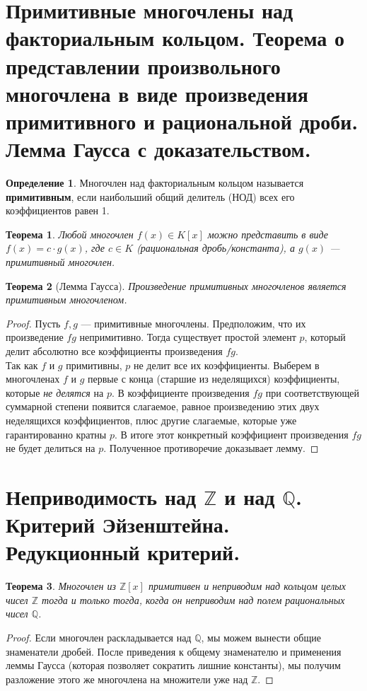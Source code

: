 \documentclass[12pt, a4paper]{article}
\theoremstyle{definition}
\newtheorem{definition}{Определение}[section]
\theoremstyle{plain}
\newtheorem{theorem}{Теорема}[section]
\begin{document}
	\newpage
	\section{Примитивные многочлены над факториальным кольцом. Теорема о представлении произвольного многочлена в виде произведения примитивного и рациональной дроби. Лемма Гаусса с доказательством.}
	
	\begin{definition}
		Многочлен над факториальным кольцом называется \textbf{примитивным}, если наибольший общий делитель (НОД) всех его коэффициентов равен 1.
	\end{definition}
	
	\begin{theorem}
		Любой многочлен $f(x) \in K[x]$ можно представить в виде $f(x) = c \cdot g(x)$, где $c \in K$ (рациональная дробь/константа), а $g(x)$ — примитивный многочлен.
	\end{theorem}
	
	\begin{theorem}[Лемма Гаусса]
		Произведение примитивных многочленов является примитивным многочленом.
	\end{theorem}
	\begin{proof}
		Пусть $f, g$ — примитивные многочлены. Предположим, что их произведение $fg$ непримитивно. Тогда существует простой элемент $p$, который делит абсолютно все коэффициенты произведения $fg$. \\
		Так как $f$ и $g$ примитивны, $p$ не делит все их коэффициенты. Выберем в многочленах $f$ и $g$ первые с конца (старшие из неделящихся) коэффициенты, которые \textit{не делятся} на $p$. В коэффициенте произведения $fg$ при соответствующей суммарной степени появится слагаемое, равное произведению этих двух неделящихся коэффициентов, плюс другие слагаемые, которые уже гарантированно кратны $p$. В итоге этот конкретный коэффициент произведения $fg$ не будет делиться на $p$. Полученное противоречие доказывает лемму.
	\end{proof}
	
	\newpage
	\section{Неприводимость над $\mathbb{Z}$ и над $\mathbb{Q}$. Критерий Эйзенштейна. Редукционный критерий.}
	
	\begin{theorem}
		Многочлен из $\mathbb{Z}[x]$ примитивен и неприводим над кольцом целых чисел $\mathbb{Z}$ тогда и только тогда, когда он неприводим над полем рациональных чисел $\mathbb{Q}$.
	\end{theorem}
	\begin{proof}
		Если многочлен раскладывается над $\mathbb{Q}$, мы можем вынести общие знаменатели дробей. После приведения к общему знаменателю и применения леммы Гаусса (которая позволяет сократить лишние константы), мы получим разложение этого же многочлена на множители уже над $\mathbb{Z}$.
	\end{proof}
	
\end{document}
